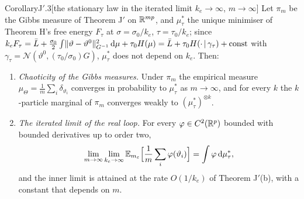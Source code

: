 \begin{thm}{Corollary}{J$'$.3}[the stationary law in the iterated limit $k_e\to\infty$, $m\to\infty$]
Let $\pi_m$ be the Gibbs measure of Theorem J$'$ on $\mathbb{R}^{mp}$, and $\mu^*_\tau$ the unique minimiser of Theorem H's
free energy $F_\tau$ at $\sigma = \sigma_0/k_e$, $\tau = \tau_0/k_e$; since
$k_eF_\tau = \bar L + \frac{\sigma_0}2\int\lVert \vartheta - \vartheta^0\rVert^2_{G^{-1}}\,\mathrm{d}\mu + \tau_0H(\mu)
= \bar L + \tau_0H(\cdot\,|\,\gamma_\tau) + \mathrm{const}$ with $\gamma_\tau = \mathcal{N}(\vartheta^0,(\tau_0/\sigma_0)G)$,
$\mu^*_\tau$ does not depend on $k_e$. Then:
\begin{enumerate}[label=\textup{(\roman*)}]
  \item \emph{Chaoticity of the Gibbs measures.} Under $\pi_m$ the empirical measure
    $\mu_\Theta = \frac1m\sum_i\delta_{\vartheta_i}$ converges in probability to $\mu^*_\tau$ as $m\to\infty$, and
    for every $k$ the $k$-particle marginal of $\pi_m$ converges weakly to $(\mu^*_\tau)^{\otimes k}$.
  \item \emph{The iterated limit of the real loop.} For every $\varphi\in C^2(\mathbb{R}^p)$ bounded with bounded
    derivatives up to order two,
    \[
      \lim_{m\to\infty}\lim_{k_e\to\infty}\mathbb{E}_{m_\varepsilon}\Bigl[\frac1m\sum_i\varphi(\vartheta_i)\Bigr] = \int\varphi\,\mathrm{d}\mu^*_\tau,
    \]
    and the inner limit is attained at the rate $O(1/k_e)$ of Theorem J$'$(b), with a constant that depends on $m$.
\end{enumerate}
\end{thm}

